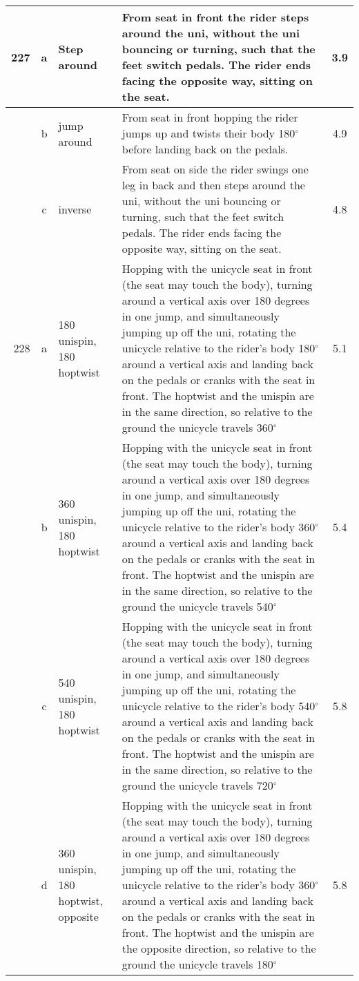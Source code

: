 \begin{longtable}{|r|c|p{4cm}|p{8cm}|c|}
\hline
227 & a & Step around & From seat in front the rider steps around the uni, without the uni bouncing or turning, such that the feet switch pedals. The rider ends facing the opposite way, sitting on the seat.  & 3.9 \\ 
\hline
  & b & jump around & From seat in front hopping the rider jumps up and twists their body 180$^\circ$ before landing back on the pedals. & 4.9 \\ 
\hline
  & c & inverse & From seat on side the rider swings one leg in back and then steps around the uni, without the uni bouncing or turning, such that the feet switch pedals. The rider ends facing the opposite way, sitting on the seat. & 4.8 \\ 
\hline
228 & a & 180 unispin, 180 hoptwist & Hopping with the unicycle seat in front (the seat may touch the body), turning around a vertical axis over 180 degrees in one jump, and simultaneously jumping up off the uni, rotating the unicycle relative to the rider’s body 180$^\circ$ around a vertical axis and landing back on the pedals or cranks with the seat in front. The hoptwist and the unispin are in the same direction, so relative to the ground the unicycle travels 360$^\circ$  & 5.1 \\ 
\hline
  & b & 360 unispin, 180 hoptwist & Hopping with the unicycle seat in front (the seat may touch the body), turning around a vertical axis over 180 degrees in one jump, and simultaneously jumping up off the uni, rotating the unicycle relative to the rider’s body 360$^\circ$ around a vertical axis and landing back on the pedals or cranks with the seat in front. The hoptwist and the unispin are in the same direction, so relative to the ground the unicycle travels 540$^\circ$  & 5.4 \\ 
\hline
  & c & 540 unispin, 180 hoptwist & Hopping with the unicycle seat in front (the seat may touch the body), turning around a vertical axis over 180 degrees in one jump, and simultaneously jumping up off the uni, rotating the unicycle relative to the rider’s body 540$^\circ$ around a vertical axis and landing back on the pedals or cranks with the seat in front. The hoptwist and the unispin are in the same direction, so relative to the ground the unicycle travels 720$^\circ$  & 5.8 \\ 
\hline
  & d & 360 unispin, 180 hoptwist, opposite & Hopping with the unicycle seat in front (the seat may touch the body), turning around a vertical axis over 180 degrees in one jump, and simultaneously jumping up off the uni, rotating the unicycle relative to the rider’s body 360$^\circ$ around a vertical axis and landing back on the pedals or cranks with the seat in front. The hoptwist and the unispin are the opposite direction, so relative to the ground the unicycle travels 180$^\circ$ & 5.8 \\ 

\end{longtable}
